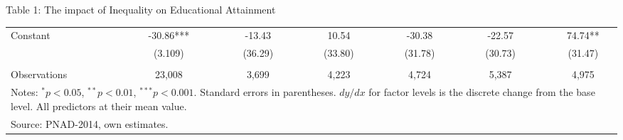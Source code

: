 \documentclass{beamer}
\begin{document}
\begin{frame}[label=main6]{\scriptsize Table 1: The impact of Inequality on Educational Attainment \hyperlink{Robustness}{\beamerbutton {\textcolor{red}{Robustness Checks}}}}
\begin{table}[htbp]
\begin{adjustbox}{max width=\textwidth}
\begin{tabular}{lllllllllllll}
    Constant &       & \multicolumn{1}{c}{-30.86***} &       & \multicolumn{1}{c}{-13.43} &       & \multicolumn{1}{c}{10.54} &       & \multicolumn{1}{c}{-30.38} &       & \multicolumn{1}{c}{-22.57} &       & \multicolumn{1}{c}{74.74**} \\
          &       & \multicolumn{1}{c}{(3.109)} &       & \multicolumn{1}{c}{(36.29)} &       & \multicolumn{1}{c}{(33.80)} &       & \multicolumn{1}{c}{(31.78)} &       & \multicolumn{1}{c}{(30.73)} &       & \multicolumn{1}{c}{(31.47)} \\
          &       & \multicolumn{1}{c}{} &       & \multicolumn{1}{c}{} &       & \multicolumn{1}{c}{} &       & \multicolumn{1}{c}{} &       & \multicolumn{1}{c}{} &       & \multicolumn{1}{c}{} \\
    Observations &       & \multicolumn{1}{c}{23,008} &       & \multicolumn{1}{c}{3,699} &       & \multicolumn{1}{c}{4,223} &       & \multicolumn{1}{c}{4,724} &       & \multicolumn{1}{c}{5,387} &       & \multicolumn{1}{c}{4,975} \\
    \midrule
    \multicolumn{13}{p{63.685em}}{Notes: $^{*}p<0.05$, $^{**}p<0.01$, $^{***}p<0.001$. Standard errors in parentheses. $dy/dx$ for factor levels is the discrete change from the base level. All predictors at their mean value.} \\
    \multicolumn{6}{l}{Source: PNAD-2014, own estimates.} \\
    \end{tabular}%
  \label{tab:Dropout}%
  \end{adjustbox}
\end{table}%
\end{frame}
\end{document}
